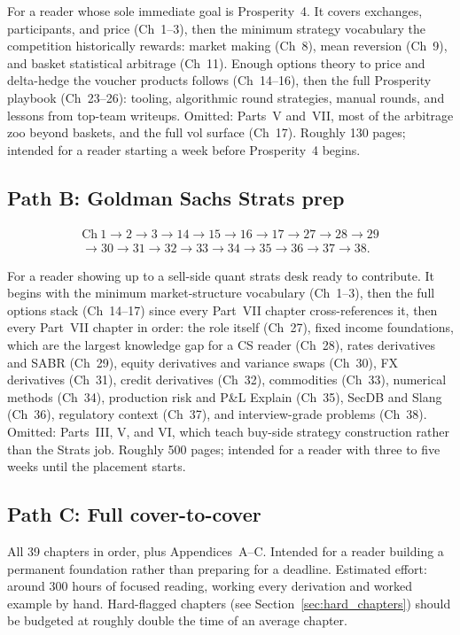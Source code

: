 For a reader whose sole immediate goal is Prosperity~4. It covers
exchanges, participants, and price (Ch~1--3), then the minimum strategy
vocabulary the competition historically rewards: market making (Ch~8),
mean reversion (Ch~9), and basket statistical arbitrage (Ch~11). Enough
options theory to price and delta-hedge the voucher products follows
(Ch~14--16), then the full Prosperity playbook (Ch~23--26): tooling,
algorithmic round strategies, manual rounds, and lessons from top-team
writeups. Omitted: Parts~V and~VII, most of the arbitrage zoo beyond
baskets, and the full vol surface (Ch~17). Roughly 130 pages; intended
for a reader starting a week before Prosperity~4 begins.

\subsection*{Path B: Goldman Sachs Strats prep}

\[
\begin{gathered}
\text{Ch}\ 1 \to 2 \to 3 \to 14 \to 15 \to 16 \to 17 \to 27 \to 28 \to 29 \\
\to 30 \to 31 \to 32 \to 33 \to 34 \to 35 \to 36 \to 37 \to 38.
\end{gathered}
\]

For a reader showing up to a sell-side quant strats desk ready to
contribute. It begins with the minimum market-structure vocabulary
(Ch~1--3), then the full options stack (Ch~14--17) since every Part~VII
chapter cross-references it, then every Part~VII chapter in order: the
role itself (Ch~27), fixed income foundations, which are the largest
knowledge gap for a CS reader (Ch~28), rates derivatives and SABR (Ch~29), equity
derivatives and variance swaps (Ch~30), FX derivatives (Ch~31), credit
derivatives (Ch~32), commodities (Ch~33), numerical methods (Ch~34),
production risk and P\&L Explain (Ch~35), SecDB and Slang (Ch~36),
regulatory context (Ch~37), and interview-grade problems (Ch~38).
Omitted: Parts~III, V, and VI, which teach buy-side strategy
construction rather than the Strats job. Roughly 500 pages; intended for a
reader with three to five weeks until the placement starts.

\subsection*{Path C: Full cover-to-cover}

All 39 chapters in order, plus Appendices~A--C. Intended for a reader
building a permanent foundation rather than preparing for a deadline.
Estimated effort: around 300 hours of focused reading, working every
derivation and worked example by hand. Hard-flagged chapters (see
Section~\ref{sec:hard_chapters}) should be budgeted at roughly double
the time of an average chapter.

